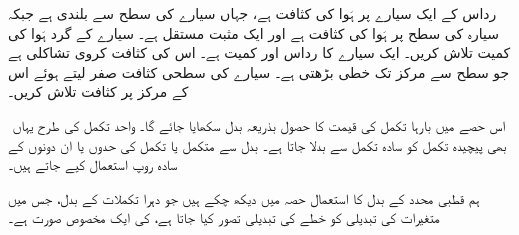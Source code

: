  رداس  کے ایک سیارے  پر  ہَوا کی کثافت  ہے،  جہاں سیارے کی سطح سے بلندی   ہے جبکہ سیارہ کی سطح پر ہَوا کی کثافت  ہے اور  ایک مثبت  مستقل ہے۔ سیارے  کے گرد  ہَوا کی کمیت تلاش کریں۔
ایک سیارے  کا رداس  اور کمیت  ہے۔ اس کی کثافت کروی تشاکلی ہے جو  سطح سے مرکز تک خطی بڑھتی ہے۔ سیارے کی سطحی کثافت صفر لیتے ہوئے  اس  کے مرکز پر کثافت تلاش کریں۔


﻿
اس حصے  میں بارہا تکمل کی قیمت کا حصول بذریعہ بدل سکھایا جائے گا۔ واحد تکمل کی طرح یہاں بھی پیچیدہ تکمل کو سادہ تکمل سے بدلا  جاتا  ہے۔ بدل سے متکمل  یا تکمل کی حدوں یا ان دونوں  کے  سادہ  روپ استعمال کیے  جاتے ہیں۔




ہم قطبی محدد  کے بدل کا استعمال حصہ  میں  دیکھ چکے ہیں جو دہرا تکملات کے بدل، جس میں متغیرات کی تبدیلی کو خطے کی تبدیلی تصور کیا جاتا ہے، کی ایک  مخصوص صورت ہے۔ 


